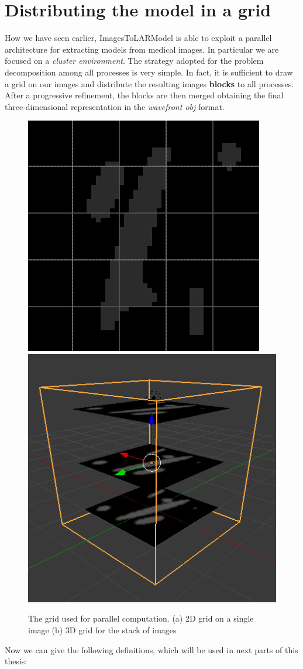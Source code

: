 \section{Distributing the model in a grid}\label{sec31:Grid}

How we have seen earlier, ImagesToLARModel is able to exploit a parallel architecture for extracting models from medical images. In particular we are focused on a \textit{cluster environment}. The strategy adopted for the problem decomposition among all processes is very simple. In fact, it is sufficient to draw a grid on our images and distribute the resulting images \textbf{blocks} to all processes. After a progressive refinement, the blocks are then merged obtaining the final three-dimensional representation in the \textit{wavefront obj} format.

\begin{figure}[htb] %
   \centering
   \includegraphics[width=0.45\linewidth]{images/imageGrid.png} \hfill
   \includegraphics[width=0.45\linewidth]{images/imageGrid3d.png}
   \caption[The grid used for parallel computation]{The grid used for parallel computation. (a) 2D grid on a single image (b) 3D grid for the stack of images}
   \label{fig:grid}
\end{figure}

Now we can give the following definitions, which will be used in next parts of this thesis:

